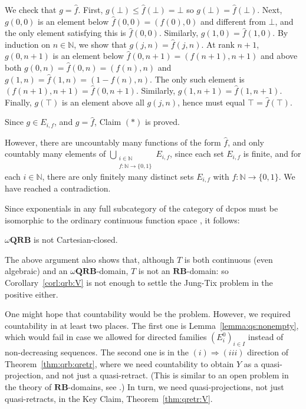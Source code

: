 \documentclass{LMCS}
\newcommand\limp{\Rightarrow}
\newcommand\nat{\mathbb{N}}
\newcommand\QRB{\mathbf{QRB}}
\newcommand\RB{\mathbf{RB}}
\begin{document}
We check that $g=\hat f$.  First, $g (\bot) \leq \hat f (\bot) = \bot$
so $g (\bot)=\hat f (\bot)$.  Next, $g (0, 0)$ is an element below
$\hat f (0, 0) = (f (0), 0)$ and different from $\bot$, and the only
element satisfying this is $\hat f (0, 0)$.  Similarly, $g (1, 0) =
\hat f (1, 0)$.  By induction on $n \in \nat$, we show that $g (j, n)
= \hat f (j, n)$.  At rank $n+1$, $g (0, n+1)$ is an element below
$\hat f (0, n+1) = (f (n+1), n+1)$ and above both $g (0, n) = \hat f
(0, n) = (f (n), n)$ and $g (1, n) = \hat f (1, n) = (1-f(n), n)$.
The only such element is $(f (n+1), n+1) = \hat f (0, n+1)$.
Similarly, $g (1, n+1) = \hat f(1, n+1)$.  Finally, $g (\top)$ is an
element above all $g (j, n)$, hence must equal $\top = \hat f (\top)$.

Since $g \in E_{i, f}$, and $g = \hat f$, Claim $(*)$ is proved.

However, there are uncountably many functions of the form $\hat f$,
and only countably many elements of $\bigcup_{\substack{i \in \nat\\f
    : \nat \to \{0, 1\}}} E_{i,f}$, since each set $E_{i,f}$ is
finite, and for each $i \in \nat$, there are only finitely many
distinct sets $E_{i, f}$ with $f : \nat \to \{0, 1\}$.  We have
reached a contradiction.

Since exponentials in any full subcategory of the category of dcpos
must be isomorphic to the ordinary continuous function space
\cite{Smyth:CCC}, it follows:
\begin{prop}
  $\omega\QRB$ is not Cartesian-closed.
\end{prop}
The above argument also shows that, although $T$ is both continuous
(even algebraic) and an $\omega\QRB$-domain, $T$ is not an
$\RB$-domain: so Corollary~\ref{corl:qrb:V} is not enough to settle
the Jung-Tix problem in the positive either.

One might hope that countability would be the problem.  However, we
required countability in at least two places.  The first one is
Lemma~\ref{lemma:qs:nonempty}, which would fail in case we allowed for
directed families ${(E^0_i)}_{i \in I}$ instead of non-decreasing
sequences.  The second one is in the $(i) \limp (iii)$ direction of
Theorem~\ref{thm:qrb:qretr}, where we need countability to obtain $Y$
as a quasi-projection, and not just a quasi-retract.  (This is similar
to an open problem in the theory of $\RB$-domains, see \cite[Remark
after Theorem~4.9]{Jung:CCC}.)  In turn, we need quasi-projections,
not just quasi-retracts, in the Key Claim, Theorem~\ref{thm:qretr:V}.
\end{document}
